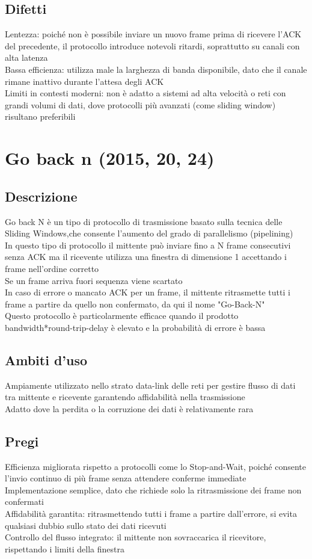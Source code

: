 \documentclass[10pt,oneside,a4paper]{article}
\begin{document}
\subsection{Difetti}
Lentezza: poiché non è possibile inviare un nuovo frame prima di ricevere l'ACK del precedente, il protocollo introduce notevoli ritardi, soprattutto su canali con alta latenza\\
Bassa efficienza: utilizza male la larghezza di banda disponibile, dato che il canale rimane inattivo durante l'attesa degli ACK\\
Limiti in contesti moderni: non è adatto a sistemi ad alta velocità o reti con grandi volumi di dati, dove protocolli più avanzati (come sliding window) risultano preferibili
\section{Go back n (2015, 20, 24)}
\subsection{Descrizione}
Go back N è un tipo di protocollo di trasmissione basato sulla tecnica delle Sliding Windows,che consente l'aumento del grado di parallelismo (pipelining)\\
In questo tipo di protocollo il mittente può inviare fino a N frame consecutivi senza ACK ma il ricevente utilizza una finestra di dimensione 1 accettando i frame nell'ordine corretto\\
Se un frame arriva fuori sequenza viene scartato\\
In caso di errore o mancato ACK per un frame, il mittente ritrasmette tutti i frame a partire da quello non confermato, da qui il nome "Go-Back-N"\\
Questo protocollo è particolarmente efficace quando il prodotto bandwidth*round-trip-delay è elevato e la probabilità di errore è bassa
\subsection{Ambiti d'uso}
Ampiamente utilizzato nello strato data-link delle reti per gestire flusso di dati tra mittente e ricevente garantendo affidabilità nella trasmissione\\
Adatto dove la perdita o la corruzione dei dati è relativamente rara
\subsection{Pregi}
Efficienza migliorata rispetto a protocolli come lo Stop-and-Wait, poiché consente l'invio continuo di più frame senza attendere conferme immediate\\
Implementazione semplice, dato che richiede solo la ritrasmissione dei frame non confermati\\
Affidabilità garantita: ritrasmettendo tutti i frame a partire dall'errore, si evita qualsiasi dubbio sullo stato dei dati ricevuti\\
Controllo del flusso integrato: il mittente non sovraccarica il ricevitore, rispettando i limiti della finestra
\end{document}
